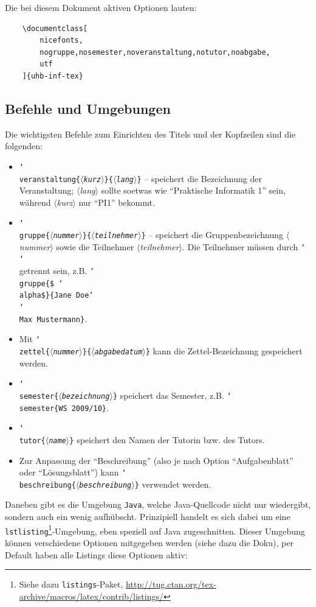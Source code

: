 \documentclass[nicefonts,nogruppe,nosemester,noveranstaltung,notutor,noabgabe,utf]{uhb-inf-tex}
\begin{document}
Die bei diesem Dokument aktiven Optionen lauten:

\begin{verbatim}
    \documentclass[
        nicefonts,
        nogruppe,nosemester,noveranstaltung,notutor,noabgabe,
        utf
    ]{uhb-inf-tex}
\end{verbatim}

\subsection{Befehle und Umgebungen}

Die wichtigsten Befehle zum Einrichten des Titels und der Kopfzeilen sind die folgenden:

\def\cs#1{\char`\\#1}
\def\p#1{$\langle$\textit{#1}$\rangle$}
\def\pb#1{\{\p{#1}\}}

\begin{itemize}
	\item \texttt{\cs{veranstaltung}\pb{kurz}\pb{lang}} -- speichert die Bezeichnung der Veranstaltung; \p{lang} sollte soetwas wie "`Praktische Informatik 1"' sein, während \p{kurz} nur "`PI1"' bekommt.
	\item \texttt{\cs{gruppe}\pb{nummer}\pb{teilnehmer}} -- speichert die Gruppenbezeichnung \p{nummer} sowie die Teilnehmer \p{teilnehmer}. Die Teilnehmer müssen durch \texttt{\cs\cs{}} getrennt sein, z.B. \texttt{\cs{gruppe}\{\$ \cs{alpha}\$\}\{Jane Doe\cs\cs{}Max Mustermann\}}.
	\item Mit \texttt{\cs{zettel}\pb{nummer}\pb{abgabedatum}} kann die Zettel-Bezeichnung gespeichert werden.
	\item \texttt{\cs{semester}\pb{bezeichnung}} speichert das Semester, z.B. \texttt{\cs{semester}\{WS 2009/10\}}.
	\item \texttt{\cs{tutor}\pb{name}} speichert den Namen der Tutorin bzw. des Tutors.
	\item Zur Anpassung der "`Beschreibung"' (also je nach Option "`Aufgabenblatt"' oder "`Lösungsblatt"') kann \texttt{\cs{beschreibung}\pb{beschreibung}} verwendet werden.
\end{itemize}

Daneben gibt es die Umgebung \texttt{Java}, welche Java-Quellcode nicht nur wiedergibt, sondern auch ein wenig aufhübscht. Prinzipiell handelt es sich dabei um eine \texttt{lstlisting}\footnote{Siehe dazu \texttt{listings}-Paket, \url{http://tug.ctan.org/tex-archive/macros/latex/contrib/listings/}}-Umgebung, eben speziell auf Java zugeschnitten. Dieser Umgebung können verschiedene Optionen mitgegeben werden (siehe dazu die Doku), per Default haben alle Listings diese Optionen aktiv:
\end{document}
